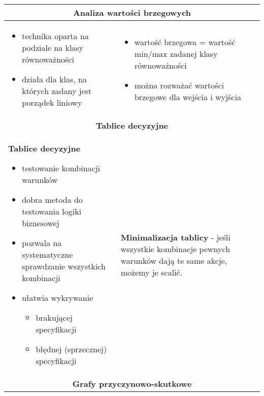 \documentclass[../main.tex]{subfiles}
\begin{document}
    \begin{table}[H]
        \begin{center}
            \begin{tabular}{| p{8cm} p{8cm}|}
                \hline
                \multicolumn{2}{|c|}{ \textbf{Analiza wartości brzegowych}} \\
                \hline
                \begin{itemize}
                    \item technika oparta na podziale na klasy równoważności
                    \item działa dla klas, na których zadany jest porządek liniowy
                \end{itemize} &
                \begin{itemize}
                    \item wartość brzegowa = wartość min/max zadanej klasy równoważności
                    \item można rozważać wartości brzegowe dla wejścia i wyjścia
                \end{itemize}
                \\
                \hline
                \hline
                \multicolumn{2}{|c|}{ \textbf{Tablice decyzyjne}} \\
                \hline
                \textbf{Tablice decyzyjne}
                \begin{itemize}
                    \item testowanie kombinacji warunków
                    \item dobra metoda do testowania logiki biznesowej
                    \item pozwala na systematyczne sprawdzanie wszystkich kombinacji
                    \item ułatwia wykrywanie
                    \begin{itemize}
                        \item brakującej specyfikacji
                        \item błędnej (sprzecznej) specyfikacji
                    \end{itemize}
                \end{itemize}
                &
                \textbf{Minimalizacja tablicy} - jeśli wszystkie kombinacje pewnych warunków dają te same akcje, możemy je scalić. \\
                \hline
                \hline
                \multicolumn{2}{|c|}{ \textbf{Grafy przyczynowo-skutkowe}} \\

\end{tabular}
\end{center}
\end{table}
\end{document}
